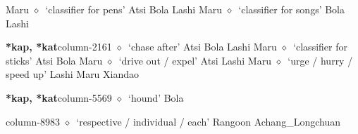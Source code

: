          Maru 
\hspace{1ex}
         $\diamond$~`classifier for pens'
         Atsi 
\hspace{1ex}
         Bola 
\hspace{1ex}
         Lashi 
\hspace{1ex}
         Maru 
\hspace{1ex}
         $\diamond$~`classifier for songs'
         Bola 
\hspace{1ex}
         Lashi 
  \item {\footnotesize \textbf{*kap, *kat}}{\tiny column-2161}
         $\diamond$~`chase after'
         Atsi 
\hspace{1ex}
         Bola 
\hspace{1ex}
         Lashi 
\hspace{1ex}
         Maru 
\hspace{1ex}
         $\diamond$~`classifier for sticks'
         Atsi 
\hspace{1ex}
         Bola 
\hspace{1ex}
         Maru 
\hspace{1ex}
         $\diamond$~`drive out / expel'
         Atsi 
\hspace{1ex}
         Lashi 
\hspace{1ex}
         Maru 
\hspace{1ex}
         $\diamond$~`urge / hurry / speed up'
         Lashi 
\hspace{1ex}
         Maru 
\hspace{1ex}
         Xiandao 
  \item {\footnotesize \textbf{*kap, *kat}}{\tiny column-5569}
         $\diamond$~`hound'
         Bola 
  \item {\footnotesize \textbf{}}{\tiny column-8983}
         $\diamond$~`respective / individual / each'
         Rangoon 
\hspace{1ex}
         Achang\_Longchuan 
